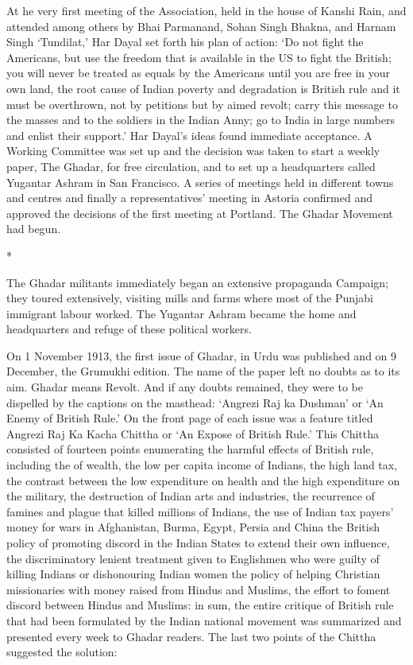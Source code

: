 At he very first meeting of the Association, held in the house of Kanshi Rain, and attended among others by Bhai Parmanand, Sohan Singh Bhakna, and Harnam Singh ‘Tundilat,’ Har Dayal set forth his plan of action: ‘Do not fight the Americans, but use the freedom that is available in the US to fight the British; you will never be treated as equals by the Americans until you are free in your own land, the root cause of Indian poverty and degradation is British rule and it must be overthrown, not by petitions but by aimed revolt; carry this message to the masses and to the soldiers in the Indian Anny; go to India in large numbers and enlist their support.’ Har Dayal’s ideas found immediate acceptance. A Working Committee was set up and the decision was taken to start a weekly paper, The Ghadar, for free circulation, and to set up a headquarters called Yugantar Ashram in San Francisco. A series of meetings held in different towns and centres and finally a representatives’ meeting in Astoria confirmed and approved the decisions of the first meeting at Portland. The Ghadar Movement had begun.

\begin{center}*\end{center}



The Ghadar militants immediately began an extensive propaganda Campaign; they toured extensively, visiting mills and farms where most of the Punjabi immigrant labour worked. The Yugantar Ashram became the home and headquarters and refuge of these political workers.

On 1 November 1913, the first issue of Ghadar, in Urdu was published and on 9 December, the Grumukhi edition. The name of the paper left no doubts as to its aim. Ghadar means Revolt. And if any doubts remained, they were to be dispelled by the captions on the masthead: ‘Angrezi Raj ka Dushman’ or ‘An Enemy of British Rule.’ On the front page of each issue was a feature titled Angrezi Raj Ka Kacha Chittha or ‘An Expose of British Rule.’ This Chittha consisted of fourteen points enumerating the harmful effects of British rule, including the of wealth, the low per capita income of Indians, the high land tax, the contrast between the low expenditure on health and the high expenditure on the military, the destruction of Indian arts and industries, the recurrence of famines and plague that killed millions of Indians, the use of Indian tax payers’ money for wars in Afghanistan, Burma, Egypt, Persia and China the British policy of promoting discord in the Indian States to extend their own influence, the discriminatory lenient treatment given to Englishmen who were guilty of killing Indians or dishonouring Indian women the policy of helping Christian missionaries with money raised from Hindus and Muslims, the effort to foment discord between Hindus and Muslims: in sum, the entire critique of British rule that had been formulated by the Indian national movement was summarized and presented every week to Ghadar readers. The last two points of the Chittha suggested the solution:

